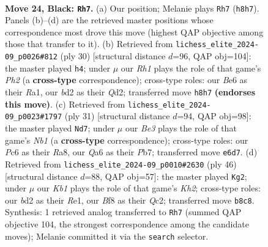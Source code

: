 \documentclass[11pt]{article}
\begin{document}
\clearpage

\begin{figure}[p]\centering
\begin{subfigure}{0.46\textwidth}\centering
\resizebox{\linewidth}{!}{%
\newchessgame
\chessboard[
  setfen={rk3b1r/pp4p1/q1p1b2p/P2p1p2/3P3P/1Q2PN2/1PKB1PP1/1R4R1 b - - 0 24},
  showmover=false,
  pgfstyle=straightmove, color=movearrow, markmove={h8-h7}
]}
\caption{}
\end{subfigure}\hfill
\begin{subfigure}{0.46\textwidth}\centering
\resizebox{\linewidth}{!}{%
\newchessgame
\chessboard[
  setfen={2r2rk1/p4ppp/bpn1p3/q2p2P1/3P1B2/P1P5/2PQ1PBP/R3R1K1 w - - 4 16},
  showmover=false,
  pgfstyle=straightmove, color=movearrow, markmove={h2-h4}
]}
\caption{}
\end{subfigure}
\\[4pt]
\begin{subfigure}{0.46\textwidth}\centering
\resizebox{\linewidth}{!}{%
\newchessgame
\chessboard[
  setfen={rn2r1k1/pp3ppp/2p2qb1/4p3/Q1P5/2N3PP/PP2PPB1/R4RK1 b - - 1 16},
  showmover=false,
  pgfstyle=straightmove, color=movearrow, markmove={b8-d7}
]}
\caption{}
\end{subfigure}\hfill
\begin{subfigure}{0.46\textwidth}\centering
\resizebox{\linewidth}{!}{%
\newchessgame
\chessboard[
  setfen={4rk2/1pp1rppp/3p3q/2nP4/p1P1PP2/P2B2PP/1PQ4K/4RR2 w - - 0 24},
  showmover=false,
  pgfstyle=straightmove, color=movearrow, markmove={h2-g2}
]}
\caption{}
\end{subfigure}
\caption{\textbf{Move 24, Black: \texttt{Rh7}.} (a) Our position; Melanie plays \texttt{Rh7} (\texttt{h8h7}). Panels (b)--(d) are the retrieved master positions whose correspondence most drove this move (highest QAP objective among those that transfer to it). (b) Retrieved from \texttt{lichess\_elite\_2024-09\_p0026\#812} (ply 30) [structural distance $d$=96, QAP obj=104]: the master played \texttt{h4}; under $\mu$ our \emph{Rh1} plays the role of that game's \emph{Ph2} (a \textbf{cross-type} correspondence); cross-type roles: our \emph{B}e6 as their \emph{R}a1, our \emph{b}d2 as their \emph{Q}d2; transferred move \texttt{h8h7} \textbf{(endorses this move)}. (c) Retrieved from \texttt{lichess\_elite\_2024-09\_p0023\#1797} (ply 31) [structural distance $d$=94, QAP obj=98]: the master played \texttt{Nd7}; under $\mu$ our \emph{Be3} plays the role of that game's \emph{Nb1} (a \textbf{cross-type} correspondence); cross-type roles: our \emph{P}c6 as their \emph{R}a8, our \emph{Q}a6 as their \emph{P}b7; transferred move \texttt{e6d7}. (d) Retrieved from \texttt{lichess\_elite\_2024-09\_p0010\#2630} (ply 46) [structural distance $d$=88, QAP obj=57]: the master played \texttt{Kg2}; under $\mu$ our \emph{Kb1} plays the role of that game's \emph{Kh2}; cross-type roles: our \emph{b}d2 as their \emph{R}e1, our \emph{B}f8 as their \emph{Q}c2; transferred move \texttt{b8c8}. Synthesis: 1 retrieved analog transferred to \texttt{Rh7} (summed QAP objective 104, the strongest correspondence among the candidate moves); Melanie committed it via the \texttt{search} selector.}
\label{fig:thought-m47}
\end{figure}
\end{document}
